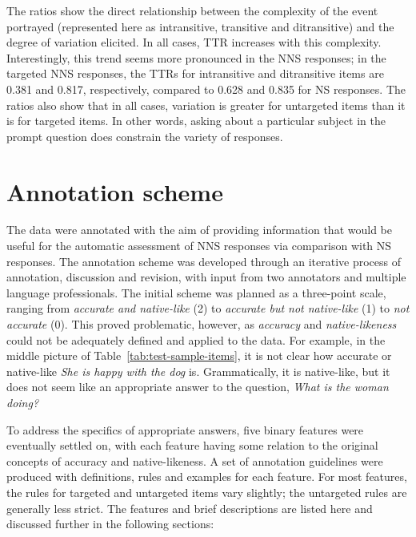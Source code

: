 \documentclass[11pt,a4paper]{article}
\renewcommand{\marginpar}[1]{}
\begin{document}
The ratios show the direct relationship between the complexity of the event portrayed (represented here as intransitive, transitive and ditransitive) and the degree of variation elicited. In all cases, TTR increases with this complexity. Interestingly, this trend seems more pronounced in the NNS responses; in the targeted NNS responses, the TTRs for intransitive and ditransitive items are 0.381 and 0.817, respectively, compared to 0.628 and 0.835 for NS responses. The ratios also show that in all cases, variation is greater for untargeted items than it is for targeted items. In other words, asking about a particular subject in the prompt question does constrain the variety of responses.


\section{Annotation scheme}
\label{sec:scheme}
The data were annotated with the aim of providing information that would be useful for the automatic assessment of NNS responses via comparison with NS responses.  
%
%
The annotation scheme was developed through an iterative process of annotation, discussion and revision, with input from two annotators and multiple language professionals. The initial scheme was planned as a three-point scale, ranging from \textit{accurate and native-like} (2) to \textit{accurate but not native-like} (1) to \textit{not accurate} (0). This proved problematic, however, as \textit{accuracy} and \textit{native-likeness} could not be adequately defined and applied to the data.
For example, in the middle picture of Table~\ref{tab:test-sample-items}, it is not clear how accurate or native-like \textit{She is happy with the dog} is.  Grammatically, it is native-like, but it does not seem like an appropriate answer to the question, \textit{What is the woman doing?}

To address the specifics of appropriate answers, five binary features were eventually settled on, with each feature having some relation to the original concepts of accuracy and native-likeness. A set of annotation guidelines were produced with definitions, rules and examples for each feature. For most features, the rules for targeted and untargeted items vary slightly; the untargeted rules are generally less strict. The features and brief descriptions are listed here and discussed further in the following sections:
\end{document}
